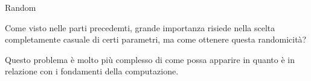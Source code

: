 \capitolo Random

Come visto nelle parti precedemti, grande importanza risiede nella
scelta completamente casuale di certi parametri, ma come ottenere
questa randomicit\`a?

Questo problema \`e molto pi\`u complesso di come possa apparire
in quanto \`e in relazione con i fondamenti della computazione.
